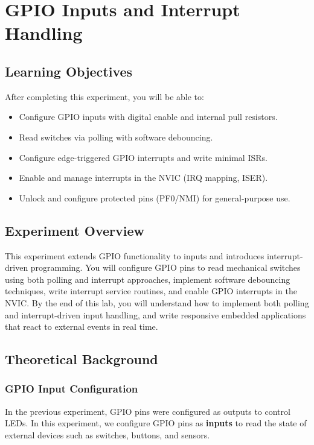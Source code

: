 \chapter{GPIO Inputs and Interrupt Handling}

\section*{Learning Objectives}
After completing this experiment, you will be able to:
\begin{itemize}[nosep]
  \item Configure GPIO inputs with digital enable and internal pull resistors.
  \item Read switches via polling with software debouncing.
  \item Configure edge-triggered GPIO interrupts and write minimal ISRs.
  \item Enable and manage interrupts in the NVIC (IRQ mapping, ISER).
  \item Unlock and configure protected pins (PF0/NMI) for general-purpose use.
\end{itemize}


\section*{Experiment Overview}
This experiment extends GPIO functionality to inputs and introduces interrupt-driven programming. You will configure GPIO pins to read mechanical switches using both polling and interrupt approaches, implement software debouncing techniques, write interrupt service routines, and enable GPIO interrupts in the NVIC. By the end of this lab, you will understand how to implement both polling and interrupt-driven input handling, and write responsive embedded applications that react to external events in real time.

\newpage


\section{Theoretical Background}

\subsection{GPIO Input Configuration}

In the previous experiment, GPIO pins were configured as outputs to control LEDs. In this experiment, we configure GPIO pins as \textbf{inputs} to read the state of external devices such as switches, buttons, and sensors.

